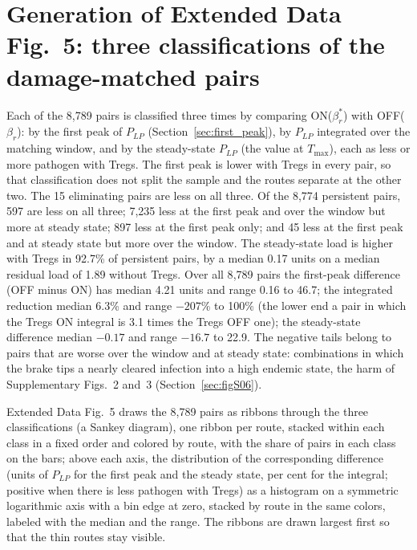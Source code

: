 \documentclass[11pt]{article}
\begin{document}
\section{Generation of Extended Data Fig.~5: three classifications of the damage-matched pairs}

Each of the 8{,}789 pairs is classified three times by comparing ON($\beta_r^{*}$) with
OFF($\beta_r$): by the first peak of $P_{LP}$ (Section~\ref{sec:first_peak}), by $P_{LP}$
integrated over the matching window, and by the steady-state $P_{LP}$ (the value at $T_{\max}$),
each as less or more pathogen with Tregs. The first peak is lower with Tregs in every pair, so
that classification does not split the sample and the routes separate at the other two. The
15 eliminating pairs are less on all three. Of the 8{,}774 persistent pairs, 597 are less on
all three; 7{,}235 less at the first peak and over the window but more at steady state; 897
less at the first peak only; and 45 less at the first peak and at steady state but more over the
window.
The steady-state load is higher with Tregs in 92.7\% of persistent pairs, by a median 0.17 units
on a median residual load of 1.89 without Tregs. Over all 8{,}789 pairs the first-peak difference
(OFF minus ON) has median 4.21 units and range 0.16 to 46.7; the integrated reduction median
6.3\% and range $-207$\% to 100\% (the lower end a pair in which the Tregs ON integral is 3.1
times the Tregs OFF one); the steady-state difference median $-0.17$ and range $-16.7$ to 22.9.
The negative tails belong to pairs that are worse over the window and at steady state:
combinations in which the brake tips a nearly cleared infection into a high endemic state, the
harm of Supplementary Figs.~2 and~3 (Section~\ref{sec:figS06}).

Extended Data Fig.~5 draws the 8{,}789 pairs as ribbons through the three classifications
(a Sankey diagram), one ribbon per route, stacked within each class in a fixed order and
colored by route, with the share of pairs in each class on the bars; above each axis, the
distribution of the corresponding difference (units of $P_{LP}$ for the first peak and the steady
state, per cent for the integral; positive when there is less pathogen with Tregs) as a
histogram on a symmetric logarithmic axis with a bin edge at zero, stacked by route in the same
colors, labeled with the median and the range. The ribbons are drawn largest first so that
the thin routes stay visible.
\end{document}
